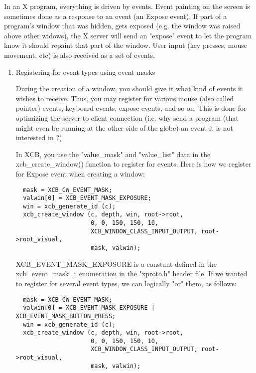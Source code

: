 \documentclass[12pt,oneside,titlepage]{book}
\begin{document}
\begin{enumerate}
  In an X program, everything is driven by events. Event painting on the
  screen is sometimes done as a response to an event (an {Expose}
  event). If part of a program's window that was hidden, gets exposed
  (e.g. the window was raised above other widows), the X server will
  send an "expose" event to let the program know it should repaint that
  part of the window. User input (key presses, mouse movement, etc) is
  also received as a set of events.

  \begin{enumerate}
  \item
    \protect\hypertarget{register}{}{Registering for event types using
    event masks}

    During the creation of a window, you should give it what kind of
    events it wishes to receive. Thus, you may register for various
    mouse (also called pointer) events, keyboard events, expose events,
    and so on. This is done for optimizing the server-to-client
    connection (i.e. why send a program (that might even be running at
    the other side of the globe) an event it is not interested in ?)

    In XCB, you use the "value\_mask" and "value\_list" data in the
    {xcb\_create\_window()} function to register for events. Here is how
    we register for {Expose} event when creating a window:

\begin{verbatim}
  mask = XCB_CW_EVENT_MASK;
  valwin[0] = XCB_EVENT_MASK_EXPOSURE;
  win = xcb_generate_id (c);
  xcb_create_window (c, depth, win, root->root,
                     0, 0, 150, 150, 10,
                     XCB_WINDOW_CLASS_INPUT_OUTPUT, root->root_visual,
                     mask, valwin);
\end{verbatim}

    {XCB\_EVENT\_MASK\_EXPOSURE} is a constant defined in the
    xcb\_event\_mask\_t enumeration in the "xproto.h" header file. If we
    wanted to register for several event types, we can logically "or"
    them, as follows:

\begin{verbatim}
  mask = XCB_CW_EVENT_MASK;
  valwin[0] = XCB_EVENT_MASK_EXPOSURE | XCB_EVENT_MASK_BUTTON_PRESS;
  win = xcb_generate_id (c);
  xcb_create_window (c, depth, win, root->root,
                     0, 0, 150, 150, 10,
                     XCB_WINDOW_CLASS_INPUT_OUTPUT, root->root_visual,
                     mask, valwin);
\end{verbatim}


\end{enumerate}
\end{enumerate}
\end{document}
